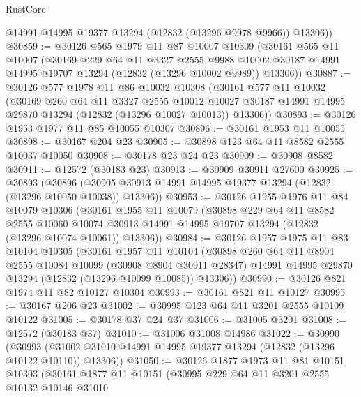 \begin{lexlean}{RustCore}
\begin{coremodule}
        @14991
        @14995
        @19377
        @13294
        (@12832 (@13296 @9978 @9966))
        @13306))
@30859 := @30126
    @565
    @1979
    @11
    @87
    @10007
    @10309
    (@30161
      @565
      @11
      @10007
      (@30169
        @229
        @64
        @11
        @3327
        @2555
        @9988
        @10002
        @30187
        @14991
        @14995
        @19707
        @13294
        (@12832 (@13296 @10002 @9989))
        @13306))
@30887 := @30126
    @577
    @1978
    @11
    @86
    @10032
    @10308
    (@30161
      @577
      @11
      @10032
      (@30169
        @260
        @64
        @11
        @3327
        @2555
        @10012
        @10027
        @30187
        @14991
        @14995
        @29870
        @13294
        (@12832 (@13296 @10027 @10013))
        @13306))
@30893 := @30126 @1953 @1977 @11 @85 @10055 @10307
@30896 := @30161 @1953 @11 @10055
@30898 := @30167 @204 @23
@30905 := @30898 @123 @64 @11 @8582 @2555 @10037 @10050
@30908 := @30178 @23 @24 @23
@30909 := @30908 @8582
@30911 := @12572 (@30183 @23)
@30913 := @30909 @30911 @27600
@30925 := @30893
    (@30896 (@30905 @30913 @14991 @14995 @19377 @13294 (@12832 (@13296 @10050 @10038)) @13306))
@30953 := @30126
    @1955
    @1976
    @11
    @84
    @10079
    @10306
    (@30161
      @1955
      @11
      @10079
      (@30898
        @229
        @64
        @11
        @8582
        @2555
        @10060
        @10074
        @30913
        @14991
        @14995
        @19707
        @13294
        (@12832 (@13296 @10074 @10061))
        @13306))
@30984 := @30126
    @1957
    @1975
    @11
    @83
    @10104
    @10305
    (@30161
      @1957
      @11
      @10104
      (@30898
        @260
        @64
        @11
        @8904
        @2555
        @10084
        @10099
        (@30908 @8904 @30911 @28347)
        @14991
        @14995
        @29870
        @13294
        (@12832 (@13296 @10099 @10085))
        @13306))
@30990 := @30126 @821 @1974 @11 @82 @10127 @10304
@30993 := @30161 @821 @11 @10127
@30995 := @30167 @206 @23
@31002 := @30995 @123 @64 @11 @3201 @2555 @10109 @10122
@31005 := @30178 @37 @24 @37
@31006 := @31005 @3201
@31008 := @12572 (@30183 @37)
@31010 := @31006 @31008 @14986
@31022 := @30990
    (@30993 (@31002 @31010 @14991 @14995 @19377 @13294 (@12832 (@13296 @10122 @10110)) @13306))
@31050 := @30126
    @1877
    @1973
    @11
    @81
    @10151
    @10303
    (@30161
      @1877
      @11
      @10151
      (@30995
        @229
        @64
        @11
        @3201
        @2555
        @10132
        @10146
        @31010

\end{coremodule}
\end{lexlean}
